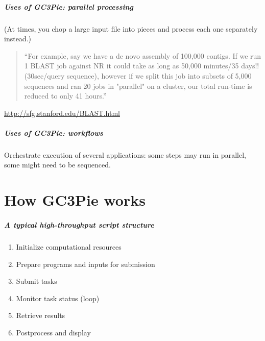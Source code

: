 \documentclass[english,serif,mathserif,xcolor=pdftex,dvipsnames,table]{beamer}
\begin{document}
\begin{frame}[fragile]
  \frametitle{Uses of GC3Pie: parallel processing}
  (At times, you chop a large input file into pieces and process each one separately instead.)

  \+
  \begin{quote}
    ``For example, say we have a de novo assembly of 100,000
    contigs. If we run 1 BLAST job against NR it could take as long as
    50,000 minutes/35 days!! (30sec/query sequence), however if we
    split this job into subsets of 5,000 sequences and ran 20 jobs in
    "parallel" on a cluster, our total run-time is reduced to only 41
    hours.''
  \end{quote}
  \begin{references}
    \url{http://sfg.stanford.edu/BLAST.html}
  \end{references}
\end{frame}


\begin{frame}
  \frametitle{Uses of GC3Pie: workflows}

  \begin{center}
    Orchestrate execution of several applications:
    some steps may run in parallel, some might need to be sequenced.

    \+
  \end{center}
\end{frame}


\part{How GC3Pie works}

\begin{frame}
  \frametitle{A typical high-throughput script structure}

  \begin{enumerate}
  \item Initialize computational resources
  \item Prepare programs and inputs for submission
  \item Submit tasks
  \item Monitor task status (loop)
  \item Retrieve results
  \item Postprocess and display
  \end{enumerate}
\end{frame}
\end{document}
